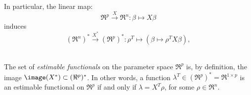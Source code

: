 \documentclass{article}
\begin{document}
\begin{remark}\quad
In particular, the linear map:
\begin{equation*}
\Re^{p} \overset{X}{\longrightarrow} \Re^{n} : \beta \longmapsto X\beta
\end{equation*}
induces
\begin{equation*}
(\Re^{n})^{*} \overset{X^{*}}{\longrightarrow} (\Re^{p})^{*} : \rho^{T} \longmapsto \left(\beta\mapsto\rho^{T}X\beta\right),
\end{equation*}
\end{remark}


\begin{definition}
\mbox{}\\
The set of \emph{estimable functionals} on the parameter space $\Re^{p}$ is, by definition, the image $\image(X^{*}) \subset (\Re^{p})^{*}$.
In other words, a function $\lambda^{T} \in (\Re^{p})^{*} = \Re^{1 \times p}$ is an estimable functional on $\Re^{p}$ if and only if $\lambda = X^{T}\rho$, for some $\rho \in \Re^{n}$.
\end{definition}
\end{document}
